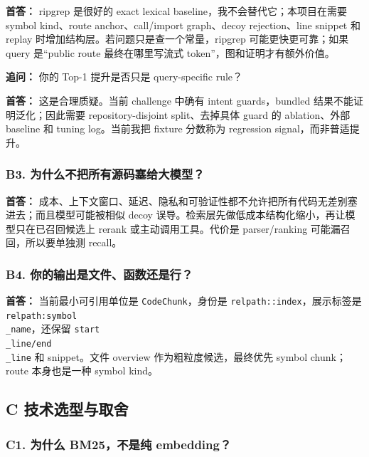 \documentclass[UTF8,12pt,openany]{ctexbook}
\begin{document}
\textbf{首答：} ripgrep 是很好的 exact lexical baseline，我不会替代它；本项目在需要 symbol kind、route anchor、call/import graph、decoy rejection、line snippet 和 replay 时增加结构层。若问题只是查一个常量，ripgrep 可能更快更可靠；如果 query 是“public route 最终在哪里写流式 token”，图和证明才有额外价值。\par

\textbf{追问：} 你的 Top-1 提升是否只是 query-specific rule？\par

\textbf{首答：} 这是合理质疑。当前 challenge 中确有 intent guards，bundled 结果不能证明泛化；因此需要 repository-disjoint split、去掉具体 guard 的 ablation、外部 baseline 和 tuning log。当前我把 fixture 分数称为 regression signal，而非普适提升。\par

\subsubsection{B3. 为什么不把所有源码塞给大模型？}

\textbf{首答：} 成本、上下文窗口、延迟、隐私和可验证性都不允许把所有代码无差别塞进去；而且模型可能被相似 decoy 误导。检索层先做低成本结构化缩小，再让模型只在已召回候选上 rerank 或主动调用工具。代价是 parser/ranking 可能漏召回，所以要单独测 recall。\par

\subsubsection{B4. 你的输出是文件、函数还是行？}

\textbf{首答：} 当前最小可引用单位是 \texttt{CodeChunk}，身份是 \texttt{relpath::index}，展示标签是 \texttt{relpath:symbol\\_name}，还保留 \texttt{start\\_line/end\\_line} 和 snippet。文件 overview 作为粗粒度候选，最终优先 symbol chunk；route 本身也是一种 symbol kind。\par

\subsection{C 技术选型与取舍}

\subsubsection{C1. 为什么 BM25，不是纯 embedding？}
\end{document}
